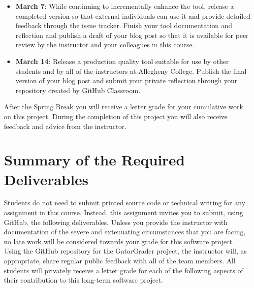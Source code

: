 \documentclass[11pt]{article}
\begin{document}
\begin{itemize}
  \item {\bf March 7}: While continuing to incrementally enhance the tool,
    release a completed version so that external individuals can use it and
    provide detailed feedback through the issue tracker. Finish your tool
    documentation and reflection and publish a draft of your blog post so that
    it is available for peer review by the instructor and your colleagues in
    this course.

  \item {\bf March 14}: Release a production quality tool suitable for use by
    other students and by all of the instructors at Allegheny College. Publish
    the final version of your blog post and submit your private reflection
    through your repository created by GitHub Classroom.

\end{itemize}

\noindent After the Spring Break you will receive a letter grade for your
cumulative work on this project. During the completion of this project you will
also receive feedback and advice from the instructor.


\section*{Summary of the Required Deliverables}

\noindent Students do not need to submit printed source code or technical
writing for any assignment in this course. Instead, this assignment invites you
to submit, using GitHub, the following deliverables.
%
Unless you provide the instructor with documentation of the severe and
extenuating circumstances that you are facing, no late work will be considered
towards your grade for this software project.
%
Using the GitHub repository for the GatorGrader project, the instructor will, as
appropriate, share regular public feedback with all of the team members. All
students will privately receive a letter grade for each of the following aspects
of their contribution to this long-term software project.
\end{document}
